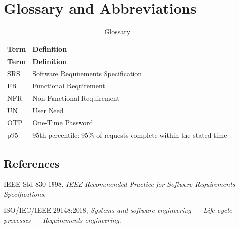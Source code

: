 \chapter{Glossary and Abbreviations}\label{app:glossary}
\begin{longtable}{|L{3cm}|p{11.2cm}|}
\caption{Glossary}\label{tab:glossary}\\
\hline
{}\sffamily\bfseries Term & \sffamily\bfseries Definition \\ \hline
\endfirsthead
\hline
{}\sffamily\bfseries Term & \sffamily\bfseries Definition \\ \hline
\endhead
SRS  & Software Requirements Specification \\ \hline
FR   & Functional Requirement \\ \hline
NFR  & Non-Functional Requirement \\ \hline
UN   & User Need \\ \hline
OTP  & One-Time Password \\ \hline
p95  & 95th percentile: 95\% of requests complete within the stated time \\ \hline
\end{longtable}

\section*{References}
\begin{enumerate}[label={[\arabic*]}]
  \item IEEE Std 830-1998, \emph{IEEE Recommended Practice for Software Requirements Specifications}.
  \item ISO/IEC/IEEE 29148:2018, \emph{Systems and software engineering --- Life cycle processes --- Requirements engineering}.
\end{enumerate}
